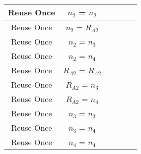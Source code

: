 \documentclass[crop]{standalone}
\newcommand{\noattack}{\color{ForestGreen}\usym{2713}\color{black}}
\begin{document}
{\begin{tabular}{|c|c|c|c|c|c|}
Reuse Once & $n_2$ = $n_2$ & \noattack & \noattack & \noattack & \noattack\\ \hline
Reuse Once & $n_2$ = $R_{A2}$ & \noattack & \noattack & \noattack & \noattack\\ \hline
Reuse Once & $n_2$ = $n_3$ & \noattack & \noattack & \noattack & \noattack\\ \hline
Reuse Once & $n_2$ = $n_4$ & \noattack & \noattack & \noattack & \noattack\\ \hline
Reuse Once & $R_{A2}$ = $R_{A2}$ & \noattack & \noattack & \noattack & \noattack\\ \hline
Reuse Once & $R_{A2}$ = $n_3$ & \noattack & \noattack & \noattack & \noattack\\ \hline
Reuse Once & $R_{A2}$ = $n_4$ & \noattack & \noattack & \noattack & \noattack\\ \hline
Reuse Once & $n_3$ = $n_3$ & \noattack & \noattack & \noattack & \noattack\\ \hline
Reuse Once & $n_3$ = $n_4$ & \noattack & \noattack & \noattack & \noattack\\ \hline
Reuse Once & $n_4$ = $n_4$ & \noattack & \noattack & \noattack & \noattack\\ \hline
\end{tabular}}
\end{document}

